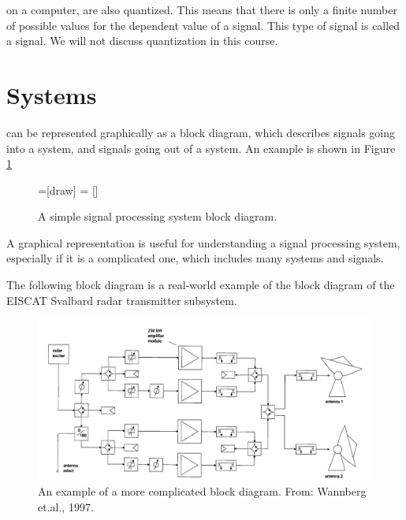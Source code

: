  on a computer, are also quantized. 
This means that there is only a finite number of possible values for the dependent value of a signal.
This type of signal is called a \emph{} signal. 
We will not discuss quantization in this course.


\section{Systems}

 can be represented graphically 
as a block diagram, which describes signals going into a system, and signals going out of a system.
An example is shown in Figure \ref{simple_sps}

\begin{figure}
   =[draw]
    = []

   \begin{center}
   \end{center}
   \label{simple_sps}
   \caption{A simple signal processing system block diagram.}
\end{figure}
A graphical representation is useful for understanding a signal processing system, 
especially if it is a complicated one, which includes many systems and signals.

The following block diagram is a real-world example of the block diagram of the 
EISCAT Svalbard radar transmitter subsystem.
\begin{figure}
   \begin{center}
      \includegraphics[width=\textwidth]{ch04/figures/wannberg97.jpg}
   \end{center}
   \caption{An example of a more complicated block diagram. From: Wannberg et.al., 1997.}
   \label{fig:esr}
\end{figure}


